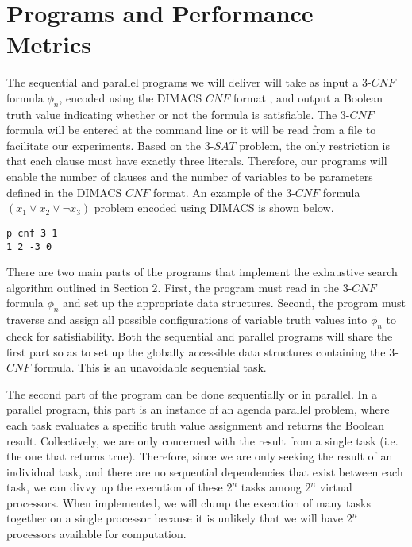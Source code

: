 \documentclass[paper=a4, fontsize=11pt]{scrartcl} %
\begin{document}
\section{Programs and Performance Metrics}
The sequential and parallel programs we will deliver will take as input 
a $3$-$CNF$ formula $\phi_n$, encoded using the DIMACS $CNF$ format \cite{dimacs}, 
and output a Boolean truth value indicating whether or not the 
formula is satisfiable. The $3$-$CNF$ formula will be entered at the command 
line or it will be read from a file to facilitate our experiments. Based on 
the $3$-$SAT$ problem, the only restriction is that each clause must have 
exactly three literals. Therefore, our programs will enable the 
number of clauses and the number of variables 
to be parameters defined in the DIMACS $CNF$ format. An example of the 
$3$-$CNF$ formula $(x_1 \lor x_2 \lor \lnot x_3)$ problem encoded using DIMACS is shown below.
\begin{center}
\begin{lstlisting}[frame=single]
p cnf 3 1
1 2 -3 0
\end{lstlisting}
\end{center}
\vspace{-1em}
There are two main parts of the programs that implement the exhaustive search algorithm outlined
in Section 2. First, the program must read in the $3$-$CNF$ formula $\phi_n$ and set up 
the appropriate data structures. Second, the program must traverse 
and assign all possible configurations of variable truth 
values into $\phi_n$ to check for satisfiability. Both the 
sequential and parallel programs will share the first part so as to set up 
the globally accessible data structures containing the $3$-$CNF$ formula. This is an unavoidable sequential task.

The second part of the program can be done sequentially or in parallel. 
In a parallel program, this part is an instance of an agenda parallel problem, where each 
task evaluates a specific truth value assignment and returns the Boolean result.
Collectively, we are only concerned with the result from a single task (i.e. the one that returns true). 
Therefore, since we are only seeking the result of an individual task, and
there are no sequential dependencies that exist between each task, we can divvy 
up the execution of these $2^n$ tasks among $2^n$ virtual processors. When 
implemented, we will clump the execution of many tasks together on a single 
processor because it is unlikely that we will have $2^n$ processors available for computation. 
\end{document}

